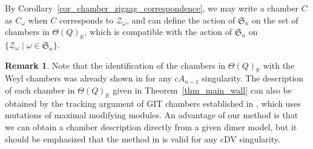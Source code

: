 \documentclass[pdftex]{sigma}
\numberwithin{equation}{section}
\theoremstyle{definition}
\newtheorem{Remark}[Theorem]{Remark}
\newcommand{\RR}{\mathbb{R}}
\newcommand{\calZ}{\mathcal{Z}}
\newcommand{\fkS}{\mathfrak{S}}
\newcommand{\permII}{\omega}
\begin{document}
By Corollary~\ref{cor_chamber_zigzag_correspondence}, we may write a chamber $C$ as $C_\permII$ when $C$ corresponds to $\calZ_\permII$,
and can define the action of $\fkS_n$ on the set of chambers in $\Theta(Q)_\RR$, which is compatible with the action of $\fkS_n$ on $\{\calZ_\permII \mid \permII\in\fkS_n\}$.

\begin{Remark}
\label{rem_homMMP}
Note that the identification of the chambers in $\Theta(Q)_\RR$ with the Weyl chambers was already shown in \cite[Lemma~6.8]{Wem_MMP}
for any $cA_{n-1}$ singularity.
The description of each chamber in $\Theta(Q)_\RR$ given in Theorem~\ref{thm_main_wall} can also be obtained by the tracking argument of
GIT chambers established in \cite[Section~5]{Wem_MMP}, which uses mutations of maximal modifying modules.
An advantage of our method is that we can obtain a chamber description directly from a given dimer model,
but it should be emphasized that the method in \cite{Wem_MMP} is valid for any cDV singularity.
\end{Remark}
\end{document}
